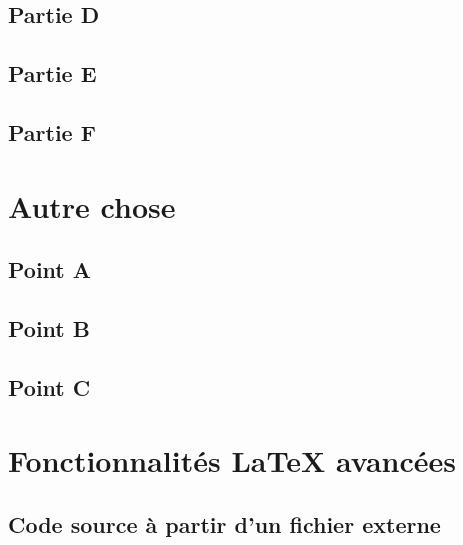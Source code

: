 \subsection{Partie D}
\subsection{Partie E}
\subsection{Partie F}

\section{Autre chose}
\subsection{Point A}
\subsection{Point B}
\subsection{Point C}

\pagebreak
























\section{Fonctionnalités \LaTeX{} avancées}

\subsection{Code source à partir d'un fichier externe}
\begin{center}
\fbox{}
\end{center}


\pagebreak

